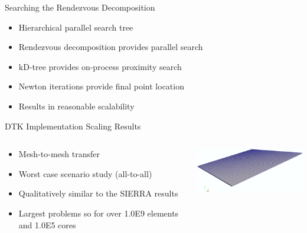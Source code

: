 \documentclass{beamer}
\begin{document}
\begin{frame}{Searching the Rendezvous Decomposition}
  
  \begin{itemize}
  \item Hierarchical parallel search tree
    \medskip
  \item Rendezvous decomposition provides parallel search
    \medskip
  \item kD-tree provides on-process proximity search
    \medskip
  \item Newton iterations provide final point location
    \medskip
  \item Results in reasonable scalability
  \end{itemize}

\end{frame}

\begin{frame}{DTK Implementation Scaling Results}

  \begin{columns}
    
    \begin{column}{0.5\textwidth}
      \begin{itemize}
      \item Mesh-to-mesh transfer
      \item Worst case scenario study (all-to-all)
        \medskip
      \item Qualitatively similar to the SIERRA results
        \medskip
      \item Largest problems so for over 1.0E9 elements and 1.0E5 cores
      \end{itemize}
    \end{column}

    \begin{column}{0.5\textwidth}
      \centering
      \includegraphics[width=2.4in]{mesh.png}
    \end{column}

  \end{columns}

\end{frame}
\end{document}
